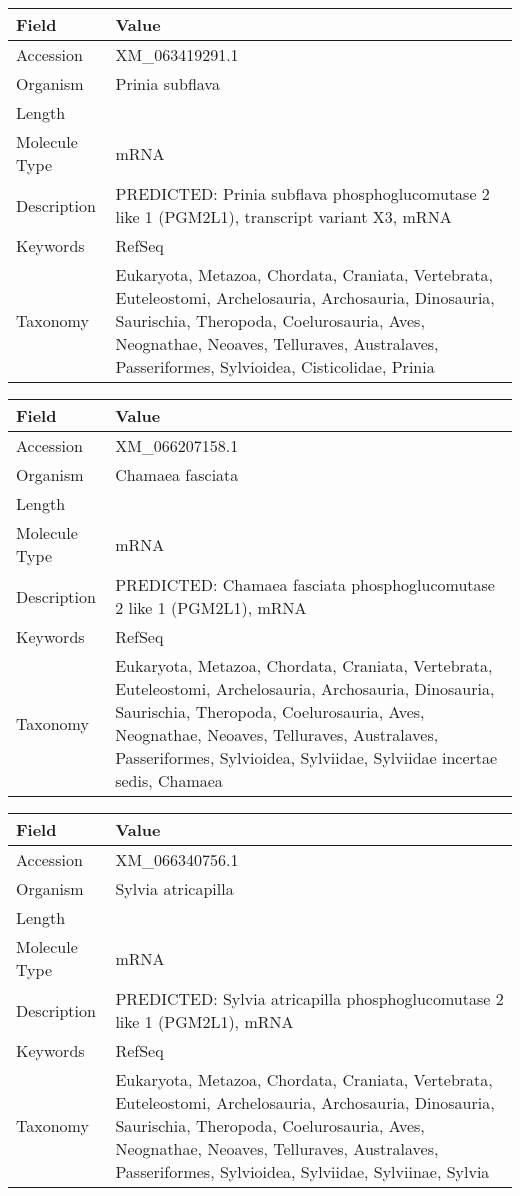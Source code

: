 \documentclass[10pt]{article}
\begin{document}
{\footnotesize
\begin{longtable}{>{\raggedright\arraybackslash}p{4.5cm} >{\raggedright\arraybackslash}p{11.5cm}}
\textbf{Field} & \textbf{Value} \\
\hline
Accession & XM\_063419291.1 \\
Organism & Prinia subflava \\
Length & 5995 \\
Molecule Type & mRNA \\
Description & PREDICTED: Prinia subflava phosphoglucomutase 2 like 1 (PGM2L1), transcript variant X3, mRNA \\
Keywords & RefSeq \\
Taxonomy & Eukaryota, Metazoa, Chordata, Craniata, Vertebrata, Euteleostomi, Archelosauria, Archosauria, Dinosauria, Saurischia, Theropoda, Coelurosauria, Aves, Neognathae, Neoaves, Telluraves, Australaves, Passeriformes, Sylvioidea, Cisticolidae, Prinia \\
\end{longtable}
}

{\footnotesize
\begin{longtable}{>{\raggedright\arraybackslash}p{4.5cm} >{\raggedright\arraybackslash}p{11.5cm}}
\textbf{Field} & \textbf{Value} \\
\hline
Accession & XM\_066207158.1 \\
Organism & Chamaea fasciata \\
Length & 5985 \\
Molecule Type & mRNA \\
Description & PREDICTED: Chamaea fasciata phosphoglucomutase 2 like 1 (PGM2L1), mRNA \\
Keywords & RefSeq \\
Taxonomy & Eukaryota, Metazoa, Chordata, Craniata, Vertebrata, Euteleostomi, Archelosauria, Archosauria, Dinosauria, Saurischia, Theropoda, Coelurosauria, Aves, Neognathae, Neoaves, Telluraves, Australaves, Passeriformes, Sylvioidea, Sylviidae, Sylviidae incertae sedis, Chamaea \\
\end{longtable}
}

{\footnotesize
\begin{longtable}{>{\raggedright\arraybackslash}p{4.5cm} >{\raggedright\arraybackslash}p{11.5cm}}
\textbf{Field} & \textbf{Value} \\
\hline
Accession & XM\_066340756.1 \\
Organism & Sylvia atricapilla \\
Length & 5988 \\
Molecule Type & mRNA \\
Description & PREDICTED: Sylvia atricapilla phosphoglucomutase 2 like 1 (PGM2L1), mRNA \\
Keywords & RefSeq \\
Taxonomy & Eukaryota, Metazoa, Chordata, Craniata, Vertebrata, Euteleostomi, Archelosauria, Archosauria, Dinosauria, Saurischia, Theropoda, Coelurosauria, Aves, Neognathae, Neoaves, Telluraves, Australaves, Passeriformes, Sylvioidea, Sylviidae, Sylviinae, Sylvia \\
\end{longtable}
}
\end{document}
